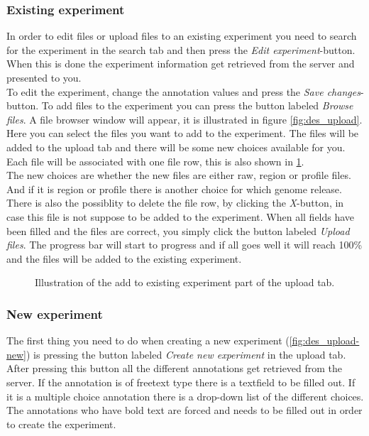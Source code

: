 \subsubsection{Existing experiment}
\label{sec:des_exists}
In order to edit files or upload files to an existing experiment you need to search for the experiment in the search tab and then press the \textit{Edit experiment}-button. When this is done the experiment information get retrieved from the server and presented to you. \\

To edit the experiment, change the annotation values and press the \textit{Save changes}-button. To add files to the experiment you can press the button labeled \textit{Browse files}. A file browser window will appear, it is illustrated in figure \ref{fig:des_upload}. Here you can select the files you want to add to the experiment. The files will be added to the upload tab and there will be some new choices available for you. Each file  will be associated with one file row, this is also shown in \ref{fig:des_upload-exists}. \\

The new choices are whether the new files are either raw, region or profile files. And if it is region or profile there is another choice for which genome release. There is also the possiblity to delete the file row, by clicking the \textit{X}-button, in case this file is not suppose to be added to the experiment. When all fields have been filled and the files are correct, you simply click the button labeled \textit{Upload files}. The progress bar will start to progress and if all goes well it will reach 100\% and the files will be added to the existing experiment.

\begin{figure}[h!]
	\caption{Illustration of the add to existing experiment part of the upload tab.}
	\label{fig:des_upload-exists}
\end{figure}
\newpage
\subsubsection{New experiment}
\label{sec:des_create}
The first thing you need to do when creating a new experiment (\ref{fig:des_upload-new}) is pressing the button labeled \textit{Create new experiment} in the upload tab. After pressing this button all the different annotations get retrieved from the server. If the annotation is of freetext type there is a textfield to be filled out. If it is a multiple choice annotation there is a drop-down list of the different choices. The annotations who have bold text are forced and needs to be filled out in order to create the experiment. 

